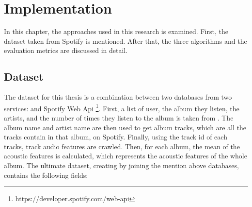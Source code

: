 \chapter{Implementation} %

\label{Chapter3} %

In this chapter, the approaches used in this research is examined. First, the dataset taken from Spotify is mentioned. After that, the three algorithms and the evaluation metrics are discussed in detail.

\section{Dataset}

The dataset for this thesis is a combination between two databases from two services:  and Spotify Web Api \footnote{https://developer.spotify.com/web-api}. First, a list of user, the album they listen, the artists, and the number of times they listen to the album is taken from . The album name and artist name are then used to get album tracks, which are all the tracks contain in that album, on Spotify. Finally, using the track id of each tracks, track audio features are crawled. Then, for each album, the mean of the acoustic features is calculated, which represents the acoustic features of the whole album. The ultimate dataset, creating by joining the mention above databases, contains the following fields:

